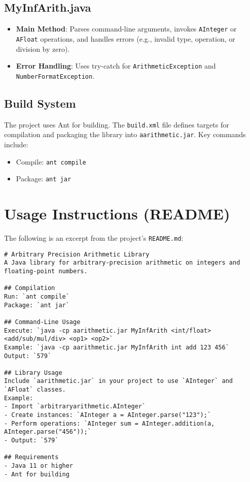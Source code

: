 \documentclass[12pt]{article}
\begin{document}
\subsection{MyInfArith.java}
\begin{itemize}
    \item \textbf{Main Method}: Parses command-line arguments, invokes \texttt{AInteger} or \texttt{AFloat} operations, and handles errors (e.g., invalid type, operation, or division by zero).
    \item \textbf{Error Handling}: Uses try-catch for \texttt{ArithmeticException} and \texttt{NumberFormatException}.
\end{itemize}

\subsection{Build System}
The project uses Ant for building. The \texttt{build.xml} file defines targets for compilation and packaging the library into \texttt{aarithmetic.jar}. Key commands include:
\begin{itemize}
    \item Compile: \texttt{ant compile}
    \item Package: \texttt{ant jar}
\end{itemize}

\section{Usage Instructions (README)}
The following is an excerpt from the project's \texttt{README.md}:

\begin{verbatim}
# Arbitrary Precision Arithmetic Library
A Java library for arbitrary-precision arithmetic on integers and floating-point numbers.

## Compilation
Run: `ant compile`
Package: `ant jar`

## Command-Line Usage
Execute: `java -cp aarithmetic.jar MyInfArith <int/float> <add/sub/mul/div> <op1> <op2>`
Example: `java -cp aarithmetic.jar MyInfArith int add 123 456`
Output: `579`

## Library Usage
Include `aarithmetic.jar` in your project to use `AInteger` and `AFloat` classes.
Example:
- Import `arbitraryarithmetic.AInteger`
- Create instances: `AInteger a = AInteger.parse("123");`
- Perform operations: `AInteger sum = AInteger.addition(a, AInteger.parse("456"));`
- Output: `579`

## Requirements
- Java 11 or higher
- Ant for building
\end{verbatim}
\end{document}
